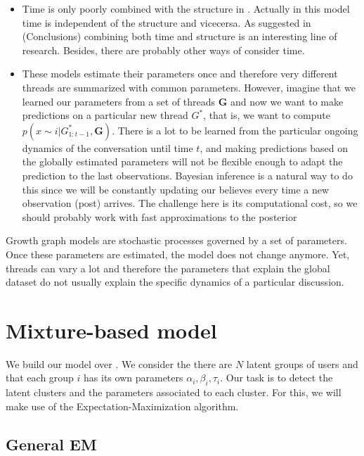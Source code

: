 \documentclass[smallextended]{svjour3}          %
\begin{document}
\begin{itemize}
	\item Time is only poorly combined with the structure in \cite{Wang2012e}. Actually in this model time is independent of the structure and vicecersa. As suggested in \cite{Gomez2012a} (Conclusions) combining both time and structure is an interesting line of research. Besides, there are probably other ways of consider time.
	
	\item These models estimate their parameters once and therefore very different threads are summarized with common parameters. However, imagine that we learned our parameters from a set of threads $\mathbf{G}$ and now we want to make predictions on a particular new thread $G^*$, that is, we want to compute $p(x \sim i | G_{1:t-1}^*, \mathbf{G})$. There is a lot to be learned from the particular ongoing dynamics of the conversation until time $t$, and making predictions based on the globally estimated parameters will not be flexible enough to adapt the prediction to the last observations. Bayesian inference is a natural way to do this since we will be constantly updating our believes every time a new observation (post) arrives. The challenge here is its computational cost, so we should  
	probably work with fast approximations to the posterior
\end{itemize}
Growth graph models are stochastic processes governed by a set of parameters. Once these parameters are estimated, the model does not change anymore. Yet, threads can vary a lot and therefore the parameters that explain the global dataset do not usually explain the specific dynamics of a particular discussion. 

\section{Mixture-based model}

We build our model over \cite{Gomez2012a}. We consider the there are $N$ latent groups of users and that each group $i$ has its own parameters $\alpha_i, \beta_i, \tau_i$. Our task is to detect the latent clusters and the parameters associated to each cluster. For this, we will make use of the Expectation-Maximization algorithm.

\subsection{General EM} 
\end{document}
